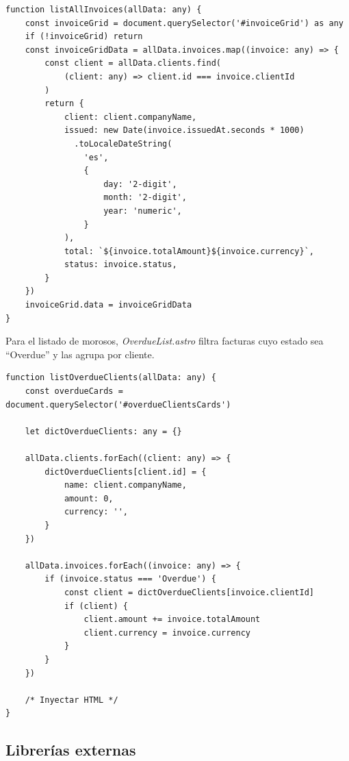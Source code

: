 \begin{large}
\begin{lstlisting}[language={}, basicstyle=\ttfamily\small, caption={Función para listar todas las facturas en la tabla}]
function listAllInvoices(allData: any) {
    const invoiceGrid = document.querySelector('#invoiceGrid') as any
    if (!invoiceGrid) return
    const invoiceGridData = allData.invoices.map((invoice: any) => {
        const client = allData.clients.find(
            (client: any) => client.id === invoice.clientId
        )
        return {
            client: client.companyName,
            issued: new Date(invoice.issuedAt.seconds * 1000)
              .toLocaleDateString(
                'es',
                {
                    day: '2-digit',
                    month: '2-digit',
                    year: 'numeric',
                }
            ),
            total: `${invoice.totalAmount}${invoice.currency}`,
            status: invoice.status,
        }
    })
    invoiceGrid.data = invoiceGridData
}
\end{lstlisting}

Para el listado de morosos, \textit{OverdueList.astro} filtra facturas cuyo estado sea “Overdue” y las agrupa por cliente.

\begin{lstlisting}[language={}, basicstyle=\ttfamily\small, caption={Función para listar clientes morosos}]
function listOverdueClients(allData: any) {
	const overdueCards = document.querySelector('#overdueClientsCards')

	let dictOverdueClients: any = {}

	allData.clients.forEach((client: any) => {
		dictOverdueClients[client.id] = {
			name: client.companyName,
			amount: 0,
			currency: '',
		}
	})

	allData.invoices.forEach((invoice: any) => {
		if (invoice.status === 'Overdue') {
			const client = dictOverdueClients[invoice.clientId]
			if (client) {
				client.amount += invoice.totalAmount
				client.currency = invoice.currency
			}
		}
	})
    
	/* Inyectar HTML */
}
\end{lstlisting}

\end{large}

\subsection{Librerías externas}

